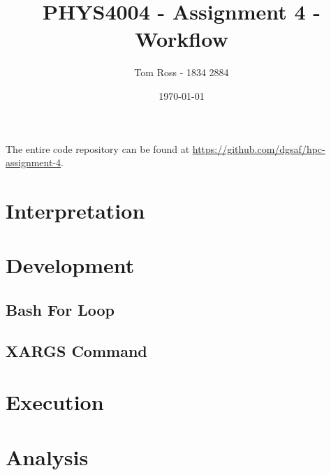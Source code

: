 \documentclass{article}
\title{PHYS4004 - Assignment 4 - Workflow}
\author{Tom Ross - 1834 2884}
\date{\today}
\begin{document}
The entire code repository can be found at
\url{https://github.com/dgsaf/hpc-assignment-4}.

\tableofcontents

\listoffigures

\listoftables

\clearpage

\section{Interpretation}
\label{sec:interpretation}



\clearpage

\section{Development}
\label{sec:development}



\subsection{Bash For Loop}
\label{sec:bash-for-loop}



\subsection{XARGS Command }
\label{sec:xargs-command}



\section{Execution}
\label{sec:execution}

\section{Analysis}
\label{sec:analysis}
\end{document}
